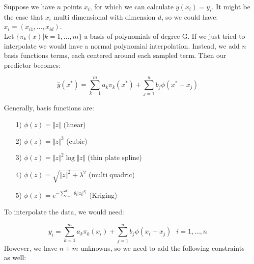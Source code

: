 \documentclass[11pt,a4paper,oneside,titlepage,openright]{book}
\begin{document}
Suppose we have $n$ points $x_i$, for which we can calculate $y(x_i) = y_i$. It might be the case that $x_i$ multi dimensional with dimension $d$, so we could have: $x_i = (x_{i1},\ldots,x_{id})$. \\ Let $\{ \pi_k(x) \vert k = 1,\ldots,m\}$ a basis of polynomials of degree G. If we just tried to interpolate we would have a normal polynomial interpolation. Instead, we add $n$ basis functions terms, each centered around each sampled term. Then our predictor becomes: 

$$ \hat y(x^*) = \sum_{k=1}^m a_k \pi_k (x^*) + \sum_{j=1}^n b_j\phi(x^*-x_j)$$

Generally, basis functions are: 
\begin{itemize}
\item[1)] $\phi(z) = \Vert z \Vert $ (linear)
\item[2)] $\phi(z) = \Vert z \Vert^3$ (cubic)
\item[3)] $\phi(z) = \Vert z \Vert^2\log{\Vert z \Vert}$ (thin plate spline)
\item[4)] $\phi(z) = \sqrt{\Vert z \Vert^2 + \lambda^2}$ (multi quadric)
\item[5)] $\phi(z) = e^{-\sum_{l=1}^d\theta_l \vert z_l \vert^{p_l}}$ (Kriging)
\end{itemize}
To interpolate the data, we would need: 

$$ y_i = \sum_{k=1}^m a_k \pi_k (x_i) + \sum_{j=1}^n b_j\phi(x_i-x_j)\text{  } i = 1,\ldots,n$$
However, we have $n+m$ unknowns, so we need to add the following constraints as well: 
\end{document}
